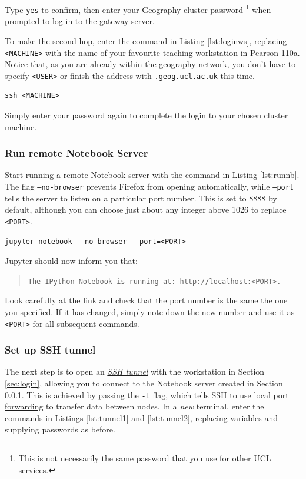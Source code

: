 \documentclass[a4paper]{article}
\begin{document}
Type \texttt{yes} to confirm, then enter your Geography cluster password \footnote{This is not necessarily the same password that you use for other UCL services.} when prompted to log in to the gateway server.

To make the second hop, enter the command in Listing \ref{lst:loginws}, replacing \texttt{\textless{}MACHINE\textgreater{}} with the name of your favourite teaching workstation in Pearson 110a. Notice that, as you are already within the geography network, you don't have to specify \texttt{\textless{}USER\textgreater{}} or finish the address with \texttt{.geog.ucl.ac.uk} this time.

\begin{lstlisting}[caption={Login to workstation}, label={lst:loginws}]
ssh <MACHINE>
\end{lstlisting}

Simply enter your password again to complete the login to your chosen cluster machine.

\subsubsection{Run remote Notebook Server}
\label{sec:runnb}

Start running a remote Notebook server with the command in Listing \ref{lst:runnb}.
The flag \texttt{--no-browser} prevents Firefox from opening automatically, while \texttt{--port} tells the server to listen on a particular port number.
This is set to 8888 by default, although you can choose just about any integer above 1026 to replace \texttt{\textless{}PORT\textgreater{}}.

\begin{lstlisting}[caption={Run Notebook server}, label={lst:runnb}]
jupyter notebook --no-browser --port=<PORT>
\end{lstlisting}

Jupyter should now inform you that:
\begin{quote}
\texttt{The IPython Notebook is running at: http://localhost:\textless{}PORT\textgreater{}.}
\end{quote}
Look carefully at the link and check that the port number is the same the one you specified.
If it has changed, simply note down the new number and use it as \texttt{\textless{}PORT\textgreater{}} for all subsequent commands.

\subsubsection{Set up SSH tunnel}
\label{sec:tunnel}
The next step is to open an \href{http://blog.trackets.com/2014/05/17/ssh-tunnel-local-and-remote-port-forwarding-explained-with-examples.html}{\emph{SSH tunnel}} with the workstation in Section \ref{sec:login}, allowing you to connect to the Notebook server created in Section \ref{sec:runnb}.
This is achieved by passing the \texttt{-L} flag, which tells SSH to use \href{https://help.ubuntu.com/community/SSH/OpenSSH/PortForwarding}{local port forwarding} to transfer data between nodes. 
In a \emph{new} terminal, enter the commands in Listings \ref{lst:tunnel1} and \ref{lst:tunnel2}, replacing variables and supplying passwords as before.
\end{document}
